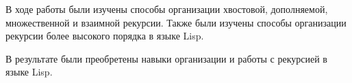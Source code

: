 \Conclusion

В ходе работы были изучены способы организации хвостовой, дополняемой, множественной и взаимной рекурсии. Также были изучены способы организации рекурсии более высокого порядка в языке Lisp.

В результате были преобретены навыки организации и работы с рекурсией в языке Lisp.
